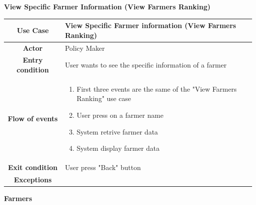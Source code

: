 \documentclass[table, 12pt]{article}
\begin{document}
\begin{itemize}
            \begin{table}[H]
                \item[] \textbf{View Specific Farmer Information (View Farmers Ranking)}
                \item[] 
                \centering
                \begin{tabular}{|c| m{}|}
                    \hline
                    \textbf{Use Case} & View Specific Farmer information (View Farmers Ranking)\\ \hline
                    \textbf{Actor} & Policy Maker\\ \hline
                    \textbf{Entry condition} & User wants to see the specific information of a farmer\\  \hline
                    \textbf{Flow of events} & \begin{enumerate}
                                                \item First three events are the same of the "View Farmers Ranking" use case 
                                                \item User press on a farmer name
                                                \item System retrive farmer data 
                                                \item System display farmer data
                                            \end{enumerate}\\ \hline
                    \textbf{Exit condition} & User press "Back" button\\ \hline
                    \textbf{Exceptions} &  \\ \hline                    
                \end{tabular}
            \end{table}
            
            \newpage


            \item \textbf {Farmers}
            

\end{itemize}
\end{document}
